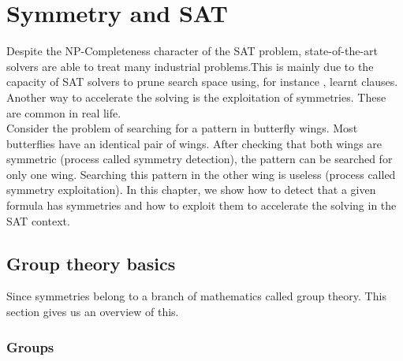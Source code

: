 \chapter{Symmetry and SAT}\label{chap:symmetryinsat}
\minitoc
Despite the NP-Completeness character of the SAT problem, state-of-the-art solvers are able to treat many industrial problems.This is mainly due to the capacity of SAT solvers to prune search space using, for instance , learnt clauses.
Another way to accelerate the solving is the exploitation of symmetries.
These are common in real life. \\
Consider the problem of searching for a pattern in butterfly wings.
Most butterflies have an identical pair of wings. After checking that both wings are symmetric
(process called symmetry detection), the pattern can be searched for only one wing. Searching this pattern in the other wing is useless (process called symmetry exploitation). 
In this chapter, we show how to detect that a given formula has symmetries and how to
exploit them to accelerate the solving in the SAT context.

\section{Group theory basics} 
Since symmetries belong to a branch of mathematics called group theory.
This section gives us an overview of this.
\subsection{Groups}

